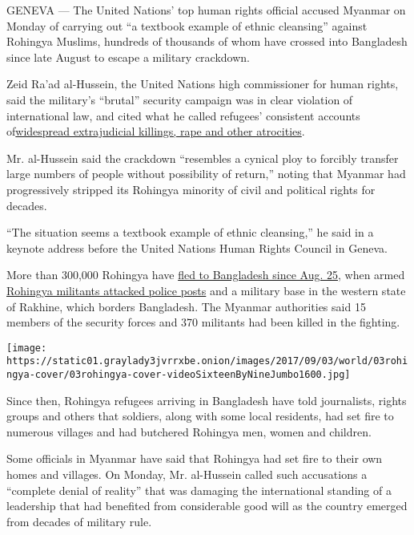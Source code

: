 GENEVA --- The United Nations' top human rights official accused Myanmar
on Monday of carrying out ``a textbook example of ethnic cleansing''
against Rohingya Muslims, hundreds of thousands of whom have crossed
into Bangladesh since late August to escape a military crackdown.

Zeid Ra'ad al-Hussein, the United Nations high commissioner for human
rights, said the military's ``brutal'' security campaign was in clear
violation of international law, and cited what he called refugees'
consistent accounts
of\href{https://www.nytimes3xbfgragh.onion/2017/09/02/world/asia/rohingya-myanmar-bangladesh-refugees-massacre.html?action=click\&contentCollection=Asia\%20Pacific\&module=RelatedCoverage\&region=Marginalia\&pgtype=article\&_r=0}{widespread
extrajudicial killings, rape and other atrocities}.

Mr. al-Hussein said the crackdown ``resembles a cynical ploy to forcibly
transfer large numbers of people without possibility of return,'' noting
that Myanmar had progressively stripped its Rohingya minority of civil
and political rights for decades.

``The situation seems a textbook example of ethnic cleansing,'' he said
in a keynote address before the United Nations Human Rights Council in
Geneva.

More than 300,000 Rohingya have
\href{https://www.nytimes3xbfgragh.onion/2017/09/08/world/asia/myanmar-rohingya-refugees-270000.html}{fled
to Bangladesh since Aug. 25}, when armed
\href{https://www.nytimes3xbfgragh.onion/2017/08/25/world/asia/myanmar-rakhine-killed-kofi-annan.html}{Rohingya
militants attacked police posts} and a military base in the western
state of Rakhine, which borders Bangladesh. The Myanmar authorities said
15 members of the security forces and 370 militants had been killed in
the fighting.

\texttt{[image: https://static01.graylady3jvrrxbe.onion/images/2017/09/03/world/03rohingya-cover/03rohingya-cover-videoSixteenByNineJumbo1600.jpg]}

Since then, Rohingya refugees arriving in Bangladesh have told
journalists, rights groups and others that soldiers, along with some
local residents, had set fire to numerous villages and had butchered
Rohingya men, women and children.

Some officials in Myanmar have said that Rohingya had set fire to their
own homes and villages. On Monday, Mr. al-Hussein called such
accusations a ``complete denial of reality'' that was damaging the
international standing of a leadership that had benefited from
considerable good will as the country emerged from decades of military
rule.

